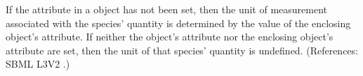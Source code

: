 If the attribute  in a \Species object has not been
set, then the unit of measurement associated with the species' quantity is
determined by the value of the enclosing \Model object's
 attribute.  If neither the \Species object's
 attribute nor the enclosing \Model object's
 attribute are set, then the unit of that species'
quantity is undefined.  (References: SBML L3V2
.)
